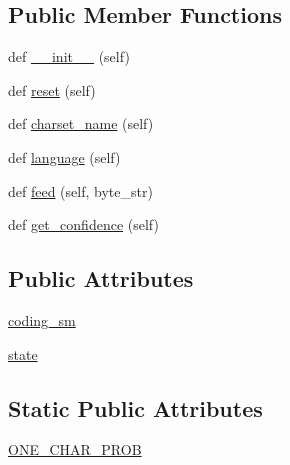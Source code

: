 \subsection*{Public Member Functions}
\begin{DoxyCompactItemize}
\item 
def \hyperlink{classpip_1_1__vendor_1_1chardet_1_1utf8prober_1_1UTF8Prober_a6a10012b49c28b2c3368d44cbefd3490}{\+\_\+\+\_\+init\+\_\+\+\_\+} (self)
\item 
def \hyperlink{classpip_1_1__vendor_1_1chardet_1_1utf8prober_1_1UTF8Prober_a4f551f7ffc90dd9723cc903718d8ecdb}{reset} (self)
\item 
def \hyperlink{classpip_1_1__vendor_1_1chardet_1_1utf8prober_1_1UTF8Prober_a1964462b44e2f4abf01244ef7e0892c6}{charset\+\_\+name} (self)
\item 
def \hyperlink{classpip_1_1__vendor_1_1chardet_1_1utf8prober_1_1UTF8Prober_a0ca12107b57022c80e8de6573fb6f692}{language} (self)
\item 
def \hyperlink{classpip_1_1__vendor_1_1chardet_1_1utf8prober_1_1UTF8Prober_a684b4070cb0cb073b75842c3552be4aa}{feed} (self, byte\+\_\+str)
\item 
def \hyperlink{classpip_1_1__vendor_1_1chardet_1_1utf8prober_1_1UTF8Prober_a2d4e200a4c3550918e304e4b707829ae}{get\+\_\+confidence} (self)
\end{DoxyCompactItemize}
\subsection*{Public Attributes}
\begin{DoxyCompactItemize}
\item 
\hyperlink{classpip_1_1__vendor_1_1chardet_1_1utf8prober_1_1UTF8Prober_aaade8ee4d6207c6982974306b1667b45}{coding\+\_\+sm}
\item 
\hyperlink{classpip_1_1__vendor_1_1chardet_1_1utf8prober_1_1UTF8Prober_a9b1391e938680cb2b9441c601e543818}{state}
\end{DoxyCompactItemize}
\subsection*{Static Public Attributes}
\begin{DoxyCompactItemize}
\item 
\hyperlink{classpip_1_1__vendor_1_1chardet_1_1utf8prober_1_1UTF8Prober_ad04d7571fdfd9a2955bf3d4cf301bf71}{O\+N\+E\+\_\+\+C\+H\+A\+R\+\_\+\+P\+R\+OB}
\end{DoxyCompactItemize}
